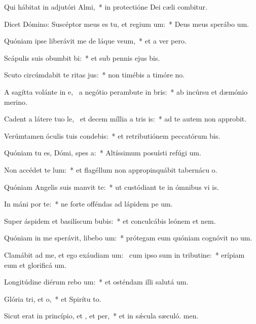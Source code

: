 \item Qui hábitat in adjutóri Almi,~* in protectióne Dei cæli combitur.
\item Dicet Dómino: Suscéptor meus es tu, et regium um:~* Deus meus sperábo  um.
\item Quóniam ipse liberávit me de láque veum,~* et a ver pero.
\item Scápulis suis obumbit bi:~* et sub pennis ejus bis.
\item Scuto circúmdabit te ritas jus:~* non timébis a timóre no.
\item A sagítta volánte in e,~\pscross{} a negótio perambute in bris:~* ab incúrsu et dæmónio merino.
\item Cadent a látere tuo le,~\pscross{} et decem míllia a tris is:~* ad te autem non approbit.
\item Verúmtamen óculis tuis condebis:~* et retributiónem peccatórum bis.
\item Quóniam tu es, Dómi, spes a:~* Altíssimum posuísti refúgi um.
\item Non accédet  te lum:~* et flagéllum non appropinquábit tabernácu o.
\item Quóniam Angelis suis manvit  te:~* ut custódiant te in ómnibus vi is.
\item In máni por te:~* ne forte offéndas ad lápidem pe um.
\item Super áspidem et basilíscum bubis:~* et conculcábis leónem et nem.
\item Quóniam in me sperávit, libebo um:~* prótegam eum quóniam cognóvit no um.
\item Clamábit ad me, et ego exáudiam um:~\pscross{} cum ipso sum in tributine:~* erípiam eum et glorificá um.
\item Longitúdine diérum rebo um:~* et osténdam illi salutá um.
\item Glória tri, et o,~* et Spirítu to.
\item Sicut erat in princípio, et , et per,~* et in sǽcula sæculó. men.
